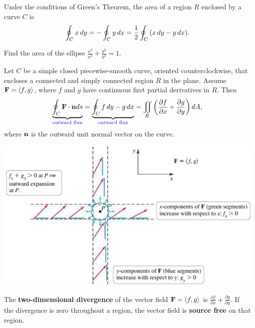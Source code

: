 \documentclass[mathNotesPreamble]{subfiles}
\begin{document}
  \begin{thmBox*}
    Under the conditions of Green's Theorem, the area of a region $R$ enclosed by a curve $C$ is
      \[\oint_C x\,dy=-\oint_C y\,dx=\frac{1}{2}\oint_C{\left(x\,dy-y\,dx\right)}.\]
  \end{thmBox*}

  \begin{ex*}
    Find the area of the ellipse $\displaystyle \frac{x^2}{a^2}+\frac{y^2}{b^2}=1$.
  \end{ex*}
  \pagebreak

  \begin{thmBox*}
    Let $C$ be a simple closed piecewise-smooth curve, oriented counterclockwise, that encloses a connected and simply connected region $R$ in the plane. Assume $\mathbf F={\left\langle f,g \right\rangle}$, where $f$ and $g$ have continuous first partial derivatives in $R$. Then
      \[\underbrace{\oint_C \mathbf F\cdot {\mathbf{n}} ds}_{\textcolor{blue}{\textnormal{outward flux}}}=\underbrace{\oint_C f\,dy-g\,dx}_{\textcolor{blue}{\textnormal{outward flux}}}=\iint\limits_R{\left(\frac{\partial f}{\partial x}+\frac{\partial g}{\partial y}\right)}\,dA,\]
    where ${\mathbf{n}}$ is the outward unit normal vector on the curve.
  \end{thmBox*}

  \begin{flushright}
    \includegraphics[width=0.9\linewidth]{images/briggs_17_04/fig17_33}
  \end{flushright}

  \begin{defn*}
    The \textbf{two-dimensional divergence} of the vector field $\mathbf F={\left\langle f,g \right\rangle}$ is $\displaystyle \frac{\partial f}{\partial x}+\frac{\partial g}{\partial y}$. If the divergence is zero throughout a region, the vector field is \textbf{source free} on that region.
  \end{defn*}
  \pagebreak
\end{document}
